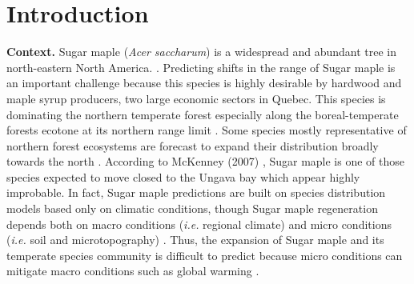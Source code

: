 


\newpage
\setcounter{page}{1}

\section{Introduction}

\textbf{Context.} Sugar maple (\textit{Acer saccharum}) is a widespread and
abundant tree in north-eastern North America.
\cite{Graignic2013,Messaoud2007,Kellman2004,Barras1998}. Predicting shifts in
the range of Sugar maple is an important challenge because this species is
highly desirable by hardwood and maple syrup producers, two large economic
sectors in Quebec. This species is dominating the northern temperate forest
especially along the boreal-temperate forests ecotone at its northern range
limit \cite{Barras1998}.  Some species mostly representative of northern
forest ecosystems are forecast to expand their distribution broadly towards
the north \cite{Sciences2014,Iverson2002}. According to McKenney (2007)
\cite{Sciences2014}, Sugar maple is one of those species expected to move
closed to the Ungava bay which appear highly improbable.  In fact, Sugar maple
predictions are built on species distribution models based only on climatic
conditions, though Sugar maple regeneration depends both on macro conditions
(\textit{i.e.} regional climate) and micro conditions (\textit{i.e.} soil and
microtopography) \cite{Graignic2013,Lafleur2010}. Thus, the expansion of Sugar
maple and its temperate species community is difficult to predict because
micro conditions can mitigate macro conditions such as global warming
\cite{DeFrenne2013}.\\

